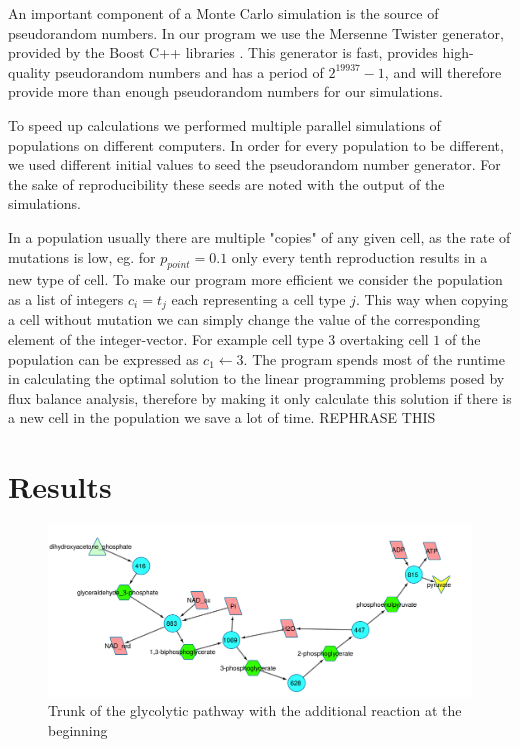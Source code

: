 \documentclass[a4paper,12pt]{article}
\begin{document}
	An important component of a Monte Carlo simulation is the source of pseudorandom numbers. In our program we use the Mersenne Twister \cite{mersennetwister} generator, provided by the Boost C++ libraries \cite{boostlibraries}. This generator is fast, provides high-quality pseudorandom numbers and has a period of $2^{19937}-1$, and will therefore provide more than enough pseudorandom numbers for our simulations.

	To speed up calculations we performed multiple parallel simulations of populations on different computers. In order for every population to be different, we used different initial values to seed the pseudorandom number generator. For the sake of reproducibility these seeds are noted with the output of the simulations. 

In a population usually there are multiple "copies" of any given cell, as the rate of mutations is low, eg. for $p_{point}=0.1$ only every tenth reproduction results in a new type of cell. To make our program more efficient we consider the population as a list of integers $c_i=t_j$ each representing a cell type $j$. This way when copying a cell without mutation we can simply change the value of the corresponding element of the integer-vector. For example cell type $3$ overtaking cell $1$ of the population can be expressed as $c_1 \leftarrow 3$.  The program spends most of the runtime in calculating the optimal solution to the linear programming problems posed by flux balance analysis, therefore by making it only calculate this solution if there is a new cell in the population we save a lot of time.  REPHRASE THIS

\section{Results}
\label{sec:results}

\begin{figure}[htpb]
	\centering
	\includegraphics[width=1\linewidth]{trunk_glyc_init_large.pdf}
	\caption{Trunk of the glycolytic pathway with the additional reaction at the beginning}
	\label{fig:truncglycinit}
\end{figure}
\end{document}
